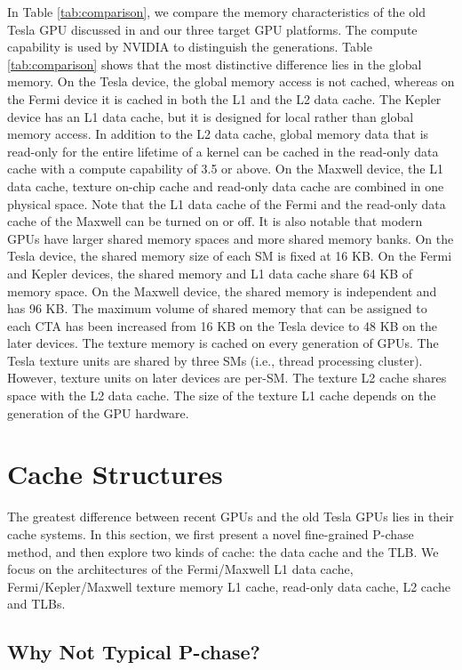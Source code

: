 \documentclass[10pt,journal,compsoc]{IEEEtran}
\theoremstyle{definition}
\begin{document}
In Table \ref{tab:comparison}, we compare the memory characteristics of the old Tesla GPU discussed in \cite{papadopoulou2009micro,wong2010demystifying} and our three target GPU platforms. The compute capability is used by NVIDIA to distinguish the generations. Table \ref{tab:comparison} shows that the most distinctive difference lies in the global memory. On the Tesla device, the global memory access is not cached, whereas on the Fermi device it is cached in both the L1 and the L2 data cache. The Kepler device has an L1 data cache, but it is designed for local rather than global memory access. In addition to the L2 data cache, global memory data that is read-only for the entire lifetime of a kernel can be cached in the read-only data cache with a compute capability of 3.5 or above. On the Maxwell device, the L1 data cache, texture on-chip cache and read-only data cache are combined in one physical space. Note that the L1 data cache of the Fermi and the read-only data cache of the Maxwell can be turned on or off. It is also notable that modern GPUs have larger shared memory spaces and more shared memory banks. On the Tesla device, the shared memory size of each SM is fixed at 16 KB. On the Fermi and Kepler devices, the shared memory and L1 data cache share 64 KB of memory space. On the Maxwell device, the shared memory is independent and has 96 KB. The maximum volume of shared memory that can be assigned to each CTA has been increased from 16 KB on the Tesla device to 48 KB on the later devices. The texture memory is cached on every generation of GPUs. The Tesla texture units are shared by three SMs (i.e., thread processing cluster). However, texture units on later devices are per-SM. The texture L2 cache shares space with the L2 data cache. The size of the texture L1 cache depends on the generation of the GPU hardware.




\section{Cache Structures}

The greatest difference between recent GPUs and the old Tesla GPUs lies in their cache systems. In this section, we first present a novel fine-grained P-chase method, and then explore two kinds of cache: the data cache and the TLB. We focus on the architectures of the Fermi/Maxwell L1 data cache, Fermi/Kepler/Maxwell texture memory L1 cache, read-only data cache, L2 cache and TLBs.

\subsection{Why Not Typical P-chase?}
\end{document}
